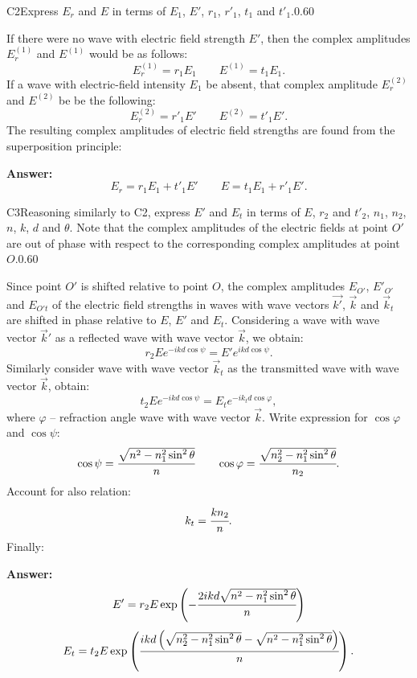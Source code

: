 \documentclass[11pt,a4paper]{article}
\begin{document}
\begin{solcard}{C2}{Express $E_r$ and $E$ in terms of $E_1$, $E'$, $r_1$, $r'_1$, $t_1$ and $t'_1$.}{0.60}

If there were no wave with electric field strength $E'$, then the complex amplitudes $E^{(1)}_r$ and $E^{(1)}$ would be as follows: $$E^{(1)}_r=r_1E_1\qquad E^{(1)}=t_1E_1{.} $$If a wave with electric-field intensity $E_1$ be absent, that complex amplitude $E^{(2)}_r$ and $E^{(2)}$ be be the following: $$E^{(2)}_r=r'_1E'\qquad E^{(2)}=t'_1E'{.} $$The resulting complex amplitudes of electric field strengths are found from the superposition principle:

\par\smallskip\noindent\textbf{Answer:} $$E_r=r_1E_1+t'_1E'\qquad E=t_1E_1+r'_1E'{.} $$
\end{solcard}

\begin{solcard}{C3}{Reasoning similarly to C2, express $E'$ and $E_t$ in terms of $E$, $r_2$ and $t'_2$, $n_1$, $n_2$, $n$, $k$, $d$ and $\theta$. Note that the complex amplitudes of the electric fields at point $O'$ are out of phase with respect to the corresponding complex amplitudes at point $O$.}{0.60}

Since point $O'$ is shifted relative to point $O$, the complex amplitudes $E_{O'}$, $E'_{O'}$ and $E_{O't}$ of the electric field strengths in waves with wave vectors $\vec{k'}$, $\vec{k}$ and $\vec{k}_t$ are shifted in phase relative to $E$, $E'$ and $E_t$. Considering a wave with wave vector $\vec{k}'$ as a reflected wave with wave vector $\vec{k}$, we obtain: $$r_2Ee^{-ikd\cos\psi}=E'e^{ikd\cos\psi}{.} $$Similarly consider wave with wave vector $\vec{k}_t$ as the transmitted wave with wave vector $\vec{k}$, obtain: $$t_2Ee^{-ikd\cos\psi}=E_te^{-ik_td\cos\varphi}{,} $$where $\varphi$ – refraction angle wave with wave vector $\vec{k }$. Write expression for $\cos\varphi$ and $\cos\psi$: $$\cos\psi=\cfrac{\sqrt{n^2-n^2_1\sin^2\theta}}{n}\qquad \cos\varphi=\cfrac{\sqrt{n^2_2-n^2_1\sin^2\theta}}{n_2}{.} $$Account for also relation: $$k_t=\cfrac{kn_2}{n}{.} $$Finally:

\par\smallskip\noindent\textbf{Answer:} $$E'=r_2E\exp\left(-\cfrac{2ikd\sqrt{n^2-n^2_1\sin^2\theta}}{n}\right) $$$$E_t=t_2E\exp\left(\cfrac{ikd\left(\sqrt{n^2_2-n^2_1\sin^2\theta}-\sqrt{n^2-n^2_1\sin^2\theta}\right)}{n}\right){.} $$
\end{solcard}
\end{document}

